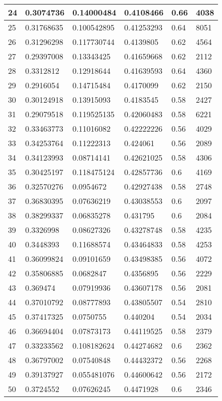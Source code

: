 \begin{longtable}{|l|l|l|l|l|l|}
24 & 0.3074736 & 0.14000484 & 0.4108466 & 0.66 & 4038 \\ \hline 
25 & 0.31768635 & 0.100542895 & 0.41253293 & 0.64 & 8051 \\ \hline 
26 & 0.31296298 & 0.117730744 & 0.4139805 & 0.62 & 4564 \\ \hline 
27 & 0.29397008 & 0.13343425 & 0.41659668 & 0.62 & 2112 \\ \hline 
28 & 0.3312812 & 0.12918644 & 0.41639593 & 0.64 & 4360 \\ \hline 
29 & 0.2916054 & 0.14715484 & 0.4170099 & 0.62 & 2150 \\ \hline 
30 & 0.30124918 & 0.13915093 & 0.4183545 & 0.58 & 2427 \\ \hline 
31 & 0.29079518 & 0.119525135 & 0.42060483 & 0.58 & 6221 \\ \hline 
32 & 0.33463773 & 0.11016082 & 0.42222226 & 0.56 & 4029 \\ \hline 
33 & 0.34253764 & 0.11222313 & 0.424061 & 0.56 & 2089 \\ \hline 
34 & 0.34123993 & 0.08714141 & 0.42621025 & 0.58 & 4306 \\ \hline 
35 & 0.30425197 & 0.118475124 & 0.42857736 & 0.6 & 4169 \\ \hline 
36 & 0.32570276 & 0.0954672 & 0.42927438 & 0.58 & 2748 \\ \hline 
37 & 0.36830395 & 0.07636219 & 0.43038553 & 0.6 & 2097 \\ \hline 
38 & 0.38299337 & 0.06835278 & 0.431795 & 0.6 & 2084 \\ \hline 
39 & 0.3326998 & 0.08627326 & 0.43278748 & 0.58 & 4235 \\ \hline 
40 & 0.3448393 & 0.11688574 & 0.43464833 & 0.58 & 4253 \\ \hline 
41 & 0.36099824 & 0.09101659 & 0.43498385 & 0.56 & 4072 \\ \hline 
42 & 0.35806885 & 0.0682847 & 0.4356895 & 0.56 & 2229 \\ \hline 
43 & 0.369474 & 0.07919936 & 0.43607178 & 0.56 & 2081 \\ \hline 
44 & 0.37010792 & 0.08777893 & 0.43805507 & 0.54 & 2810 \\ \hline 
45 & 0.37417325 & 0.0750755 & 0.440204 & 0.54 & 2034 \\ \hline 
46 & 0.36694404 & 0.07873173 & 0.44119525 & 0.58 & 2379 \\ \hline 
47 & 0.33233562 & 0.108182624 & 0.44274682 & 0.6 & 2362 \\ \hline 
48 & 0.36797002 & 0.07540848 & 0.44432372 & 0.56 & 2268 \\ \hline 
49 & 0.39137927 & 0.055481076 & 0.44600642 & 0.56 & 2172 \\ \hline 
50 & 0.3724552 & 0.07626245 & 0.4471928 & 0.6 & 2346 \\ \hline 
\end{longtable}